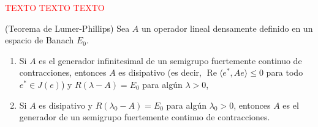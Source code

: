 \textcolor{red}{TEXTO TEXTO TEXTO}\\

\begin{Teorema}{(Teorema de Lumer-Phillips)}
    \label{ch:semigrupos:th:LumerPhillips}
    Sea $A$ un operador lineal densamente definido en un espacio de Banach $E_0$.

    \begin{enumerate}
        \item Si $A$ es el generador infinitesimal de un semigrupo fuertemente continuo de contracciones, entonces $A$ es disipativo (es decir, $\operatorname{Re}\langle e^*, Ae \rangle \leq 0$ para todo $e^* \in J(e)$) y $R(\lambda - A) = E_0$ para algún $\lambda >0$,

        \item Si $A$ es disipativo y $R(\lambda_0 - A) = E_0$ para algún $\lambda_0 > 0$, entonces $A$ es el generador de un semigrupo fuertemente continuo de contracciones.
    \end{enumerate}
\end{Teorema}

